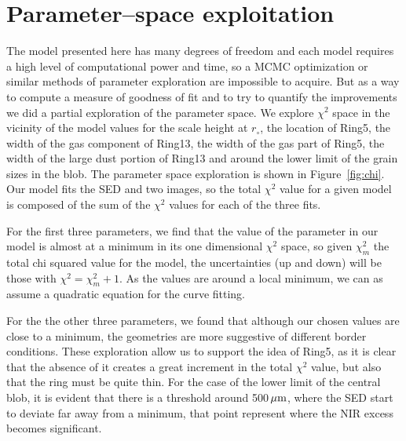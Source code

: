 \documentclass[fleqn,usenatbib,useAMS]{mnras}
\begin{document}

\appendix

\section{Parameter--space exploitation} \label{sec:Appendix}

The model presented here has many degrees of freedom and each model requires a high level of computational power and time, so a MCMC optimization or similar methods of parameter exploration are impossible to acquire. But as a way to compute a measure of goodness of fit and to try to quantify the improvements we did a partial exploration of the parameter space. We explore $\chi^2$ space in the vicinity of the model values for the scale height at $r_\circ$, the location of Ring5, the width of the gas component of Ring13, the width of the gas part of Ring5, the width of the large dust portion of Ring13 and around the lower limit of the grain sizes in the blob. The parameter space exploration is shown in Figure~\ref{fig:chi}. Our model fits the SED and two images, so the total $\chi^2$ value for a given model is composed of the sum of the $\chi^2$ values for each of the three fits.

For the first three parameters, we find that the value of the parameter in our model is almost at a minimum in its one dimensional $\chi^2$ space, so given $\chi^2_m$ the total chi squared value for the model, the uncertainties (up and down) will be those with $\chi^2=\chi^2_m+1$. As the values are around a local minimum, we can as assume a quadratic equation for the curve fitting.

For the the other three parameters, we found that although our chosen values are close to a minimum, the geometries are more suggestive of different border conditions. These exploration allow us to support the idea of Ring5, as it is clear that the absence of it creates a great increment in the total $\chi^2$ value, but also that the ring must be quite thin. For the case of the lower limit of the central blob, it is evident that there is a threshold around 500\,$\hbox{$\mu$m}$, where the SED start to deviate far away from a minimum, that point represent where the NIR excess becomes significant.
\end{document}
